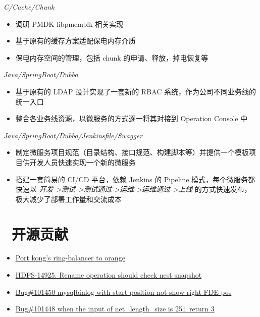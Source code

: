 \documentclass{resume}
\begin{document}
\textit{C/Cache/Chunk}
\begin{onehalfspacing}
\begin{itemize}
  \item 调研 PMDK libpmemblk 相关实现
  \item 基于原有的缓存方案适配保电内存介质
  \item 保电内存空间的管理，包括 chunk 的申请、释放，掉电恢复等
\end{itemize}
\end{onehalfspacing}

\textit{Java/SpringBoot/Dubbo}
\begin{onehalfspacing}
\begin{itemize}
  \item 基于原有的 LDAP 设计实现了一套新的 RBAC 系统，作为公司不同业务线的统一入口
  \item 整合各业务线资源，以微服务的方式逐一将其对接到 Operation Console 中
\end{itemize}
\end{onehalfspacing}

\textit{Java/SpringBoot/Dubbo/Jenkinsfile/Swagger}
\begin{onehalfspacing}
\begin{itemize}
  \item 制定微服务项目规范（目录结构、接口规范、构建脚本等）并提供一个模板项目供开发人员快速实现一个新的微服务
  \item 搭建一套简易的 CI/CD 平台，依赖 Jenkins 的 Pipeline 模式，每个微服务都快速以 \textit{开发->测试->测试通过->运维->运维通过->上线} 的方式快速发布，极大减少了部署工作量和交流成本
\end{itemize}
\end{onehalfspacing}

\section{\faCodeFork\ 开源贡献}
\begin{onehalfspacing}
  \begin{itemize}
    \item \href{https://github.com/orlabs/orange/pull/138}{Port kong's ring-balancer to orange}
    \item \href{https://github.com/apache/hadoop/pull/1670/files}{HDFS-14925. Rename operation should check nest snapshot}
    \item \href{https://github.com/mysql/mysql-server/pull/313}{Bug\#101450 mysqlbinlog with start-position not show right FDE pos}
    \item \href{https://github.com/mysql/mysql-server/pull/311}{Bug\#101448 when the input of net\_length\_size is 251\, return 3}
  \end{itemize}
  \end{onehalfspacing}
\end{document}
